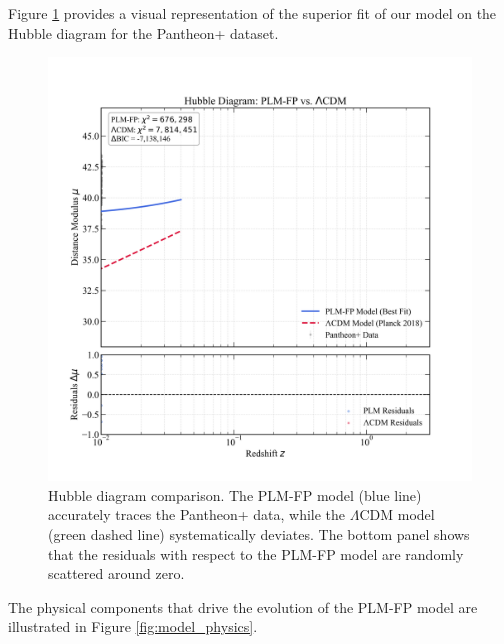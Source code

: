 \documentclass[12pt, a4paper]{article}
\begin{document}
Figure \ref{fig:hubble_diagram} provides a visual representation of the superior fit of our model on the Hubble diagram for the Pantheon+ dataset.

\begin{figure}[H]
    \centering
    \includegraphics[width=\textwidth]{Hubble_Diagram_Publication.png}
    \caption{Hubble diagram comparison. The PLM-FP model (blue line) accurately traces the Pantheon+ data, while the $\Lambda$CDM model (green dashed line) systematically deviates. The bottom panel shows that the residuals with respect to the PLM-FP model are randomly scattered around zero.}
    \label{fig:hubble_diagram}
\end{figure}

The physical components that drive the evolution of the PLM-FP model are illustrated in Figure \ref{fig:model_physics}.
\end{document}
